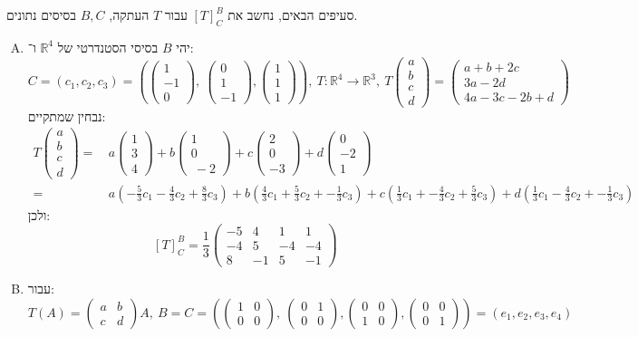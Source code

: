 \documentclass[]{article}
\newcommand\R     {\mathbb{R}}
\newcommand\co        {\colon}
\newcommand\pms[1]    {\begin{pmatrix}
        #1
\end{pmatrix}}
\newcommand\cl [1]    {\left ( #1 \right )}
\theoremstyle{definition}
\begin{document}
    \section{}
    סעיפים הבאים, נחשב את $[T]_C^B$ עבור $T$ העתקה, $B, C$ בסיסים נתונים. 
    \begin{enumerate}[(A)]
        \item יהי $B$ בסיסי הסטנדרטי של $\R^4$ ו־: 
        \[ C = (c_1, c_2, c_3) = \cl{\pms{1 \\ -1 \\ 0}, \ \pms{0 \\ 1 \\ -1},  \pms{1 \\ 1 \\ 1}}, \ T \co \R^4 \to \R^3, \ T\pms{a \\b \\c \\ d} = \pms{a + b + 2c \\ 3a - 2d \\ 4a - 3c - 2b + d} \]
        נבחין שמתקיים: 
        \begin{align*}
            T\pms{a \\ b\\ c\\ d} = & \, a\pms{1 \\ 3 \\ 4} + b\pms{1 \\ 0 \\\ -2} + c \pms{2 \\ 0 \\ -3} + d\pms{0 \\ -2 \\ 1} \\
            =& \, a\cl{-\frac{5}{3}c_1 - \frac{4}{3}c_2 + \frac{8}{3}c_3} + b\cl{\frac{4}{3}c_1 + \frac{5}{3}c_2 + -\frac{1}{3}c_3} + c\cl{\frac{1}{3}c_1 + -\frac{4}{3}c_2 + \frac{5}{3}c_3}  +d\cl{\frac{1}{3}c_1 - \frac{4}{3}c_2 + -\frac{1}{3}c_3}
        \end{align*}
        ולכן: 
        \[ [T]^B_C = \frac{1}{3}\pms{-5 & 4 & 1 & 1 \\ -4 & 5 & -4 & -4 \\ 8 & -1 & 5 & -1} \]
        \item עבור: 
        \[ T(A) = \pms{a & b \\ c& d}A, \ B = C = \cl{\pms{1 & 0 \\ 0& 0}, \ \pms{0 & 1 \\ 0 & 0}, \pms{0 & 0 \\ 1 & 0},  \pms{0 & 0 \\ 0 & 1}} = (e_1, e_2, e_3, e_4) \]

\end{enumerate}
\end{document}
